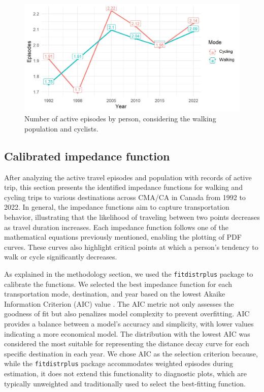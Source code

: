 \documentclass[preprint, 3p,
authoryear]{elsarticle} %
\begin{document}
\begin{figure}

{\centering \includegraphics[width=1\linewidth]{figures/episodes_per_person_by_mode} 

}

\caption{Number of active episodes by person, considering the walking population and cyclists.}\label{fig:eps-per-person-by-mode-fig}
\end{figure}

\subsection{Calibrated impedance
function}\label{calibrated-impedance-function}

After analyzing the active travel episodes and population with records
of active trip, this section presents the identified impedance functions
for walking and cycling trips to various destinations across CMA/CA in
Canada from 1992 to 2022. In general, the impedance functions aim to
capture transportation behavior, illustrating that the likelihood of
traveling between two points decreases as travel duration increases.
Each impedance function follows one of the mathematical equations
previously mentioned, enabling the plotting of PDF curves. These curves
also highlight critical points at which a person's tendency to walk or
cycle significantly decreases.

As explained in the methodology section, we used the
\texttt{fitdistrplus} package \citep{delignette2015fitdistrplus} to
calibrate the functions. We selected the best impedance function for
each transportation mode, destination, and year based on the lowest
Akaike Information Criterion (AIC) value \citep{akaike1974}. The AIC
metric not only assesses the goodness of fit but also penalizes model
complexity to prevent overfitting. AIC provides a balance between a
model's accuracy and simplicity, with lower values indicating a more
economical model. The distribution with the lowest AIC was considered
the most suitable for representing the distance decay curve for each
specific destination in each year. We chose AIC as the selection
criterion because, while the \texttt{fitdistrplus} package accommodates
weighted episodes during estimation, it does not extend this
functionality to diagnostic plots, which are typically unweighted and
traditionally used to select the best-fitting function.
\end{document}
